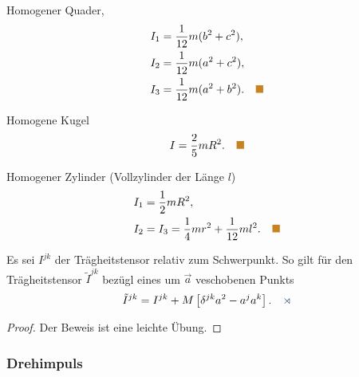 \begin{bsp}
Homogener Quader,
\begin{align*}
&I_1 = \frac{1}{12}m(b^2+c^2),\\
&I_2 = \frac{1}{12}m(a^2+c^2),\\
&I_3 = \frac{1}{12}m(a^2+b^2).\bsphere
\end{align*}
\end{bsp}
\begin{bsp}
Homogene Kugel
\begin{align*}
I=\frac{2}{5}mR^2.\bsphere
\end{align*}
\end{bsp}
\begin{bsp}
Homogener Zylinder (Vollzylinder der Länge $l$)
\begin{align*}
&I_1 = \frac{1}{2}mR^2,\\
&I_2=I_3 = \frac{1}{4}mr^2 + \frac{1}{12}ml^2.\bsphere
\end{align*}
\end{bsp}

\begin{propn}
Es sei $I^{jk}$ der Trägheitstensor relativ zum Schwerpunkt. So gilt für den
Trägheitstensor $\tilde{I}^{jk}$ bezügl eines um $\vec{a}$ veschobenen Punkts
\begin{align*}
\tilde{I}^{jk} = I^{jk} + M\left[\delta^{jk} a^2 - a^j a^k\right].\fishhere
\end{align*}
\end{propn}
\begin{proof}
Der Beweis ist eine leichte Übung.\qedhere
\end{proof}

\subsubsection{Drehimpuls}


